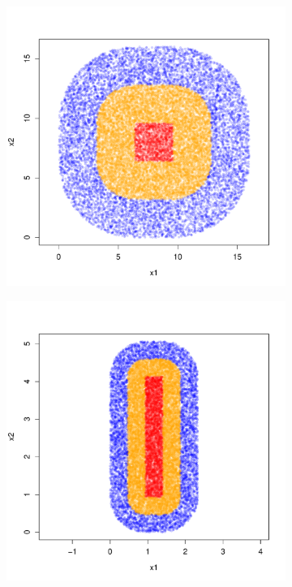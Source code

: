 \documentclass{article}
\newcommand{\1}{\mathbf{1}}
\theoremstyle{aldenthm}
\theoremstyle{aldenrmrk}
\begin{document}
\begin{figure}
	\centering
	\begin{adjustbox}{minipage=\linewidth}
		\begin{subfigure}{.33\linewidth}
			\includegraphics[width=\linewidth]{example1plots/sample2}
			\caption{}
		\end{subfigure}
		\begin{subfigure}{.33\linewidth}
			\includegraphics[width=\linewidth]{example1plots/sample1}

\end{subfigure}
\end{adjustbox}
\end{figure}
\end{document}
